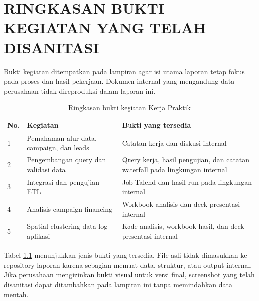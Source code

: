 \cleardoublepage
\chapter{RINGKASAN BUKTI KEGIATAN YANG TELAH DISANITASI}
Bukti kegiatan ditempatkan pada lampiran agar isi utama laporan tetap fokus pada proses dan hasil pekerjaan. Dokumen internal yang mengandung data perusahaan tidak direproduksi dalam laporan ini.

\begin{table}[htbp]
\caption{Ringkasan bukti kegiatan Kerja Praktik}
\label{tab:bukti-kegiatan}
\centering
\begin{tabularx}{\textwidth}{|p{}|p{}|X|}
\hline
\textbf{No.} & \textbf{Kegiatan} & \textbf{Bukti yang tersedia} \\
\hline
1 & Pemahaman alur data, campaign, dan leads & Catatan kerja dan diskusi internal \\
\hline
2 & Pengembangan query dan validasi data & Query kerja, hasil pengujian, dan catatan waterfall pada lingkungan internal \\
\hline
3 & Integrasi dan pengujian ETL & Job Talend dan hasil run pada lingkungan internal \\
\hline
4 & Analisis campaign financing & Workbook analisis dan deck presentasi internal \\
\hline
5 & Spatial clustering data log aplikasi & Kode analisis, workbook hasil, dan deck presentasi internal \\
\hline
\end{tabularx}
\end{table}

Tabel \ref{tab:bukti-kegiatan} menunjukkan jenis bukti yang tersedia. File asli tidak dimasukkan ke repository laporan karena sebagian memuat data, struktur, atau output internal. Jika perusahaan mengizinkan bukti visual untuk versi final, screenshot yang telah disanitasi dapat ditambahkan pada lampiran ini tanpa memindahkan data mentah.
